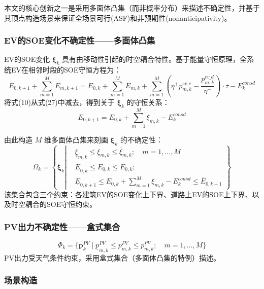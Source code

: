 \documentclass[11pt]{ctexart}
\begin{document}
本文的核心创新之一是采用多面体凸集（而非概率分布）来描述不确定性，并基于其顶点构造场景来保证全场景可行(ASF)和非预期性(nonanticipativity)。

\subsubsection{EV的SOE变化不确定性——多面体凸集}

EV的SOE变化 $\boldsymbol{\xi}_k$ 具有由移动性引起的时空耦合特性。基于能量守恒原理，全系统EV在相邻时段的SOE守恒方程为：
\begin{equation}
    E_{0,k+1} + \sum_{m=1}^{M} E_{m,k+1} = E_{0,k} + \sum_{m=1}^{M} E_{m,k} + \sum_{m=1}^{M} (\eta^+ p_{m,k}^{ev\_c} - \frac{p_{m,k}^{ev\_d}}{\eta^-}) \cdot \tau - E_k^{consd}
\end{equation}
将式(10)从式(27)中减去，得到关于 $\boldsymbol{\xi}_k$ 的守恒关系：
\begin{equation}
    E_{0,k+1} = E_{0,k} + \sum_{m=1}^{M} \xi_{m,k} - E_k^{consd}
\end{equation}

由此构造 $M$ 维多面体凸集来刻画 $\boldsymbol{\xi}_k$ 的不确定性：
\begin{equation}
    \Omega_k = \left\{ \boldsymbol{\xi}_k \left|
    \begin{aligned}
        &\underline{\xi}_{m,k} \le \xi_{m,k} \le \overline{\xi}_{m,k}; \quad m=1,...,M \\
        &\underline{E}_{0,k} \le E_{0,k} \le \overline{E}_{0,k}; \\
        &\underline{E}_{0,k+1} \le E_{0,k} + \sum_{m=1}^{M} \xi_{m,k} - E_k^{consd} \le \overline{E}_{0,k+1}
    \end{aligned}
    \right. \right\}
\end{equation}
该集合包含三个约束：各建筑EV的SOE变化上下界、道路上EV的SOE上下界、以及时空耦合的SOE守恒约束。

\subsubsection{PV出力不确定性——盒式集合}
\begin{equation}
    \Phi_k = \{ \boldsymbol{p}_k^{PV} \mid \underline{p}_{m,k}^{PV} \le p_{m,k}^{PV} \le \overline{p}_{m,k}^{PV}; \quad m=1,...,M \}
\end{equation}
PV出力受天气条件约束，采用盒式集合（多面体凸集的特例）描述。

\subsubsection{场景构造}
\end{document}
